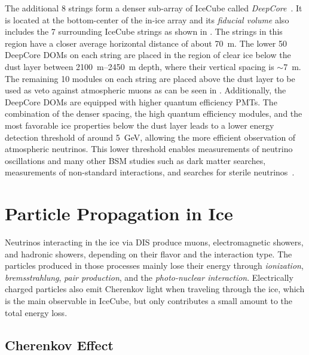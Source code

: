 The additional 8 strings form a denser sub-array of IceCube called \textit{DeepCore}~. It is located at the bottom-center of the in-ice array and its \textit{fiducial volume} also includes the 7 surrounding IceCube strings as shown in . The strings in this region have a closer average horizontal distance of about \SI{70}{\meter}. The lower 50 DeepCore DOMs on each string are placed in the region of clear ice below the dust layer between \SIrange{2100}{2450}{\meter} depth, where their vertical spacing is $\sim$\SI{7}{\meter}. The remaining 10 modules on each string are placed above the dust layer to be used as veto against atmospheric muons as can be seen in . Additionally, the DeepCore DOMs are equipped with higher quantum efficiency PMTs. The combination of the denser spacing, the high quantum efficiency modules, and the most favorable ice properties below the dust layer leads to a lower energy detection threshold of around \SI{5}{GeV}, allowing the more efficient observation of atmospheric neutrinos. This lower threshold enables measurements of neutrino oscillations and many other BSM studies such as dark matter searches, measurements of non-standard interactions, and searches for sterile neutrinos~.


\section{Particle Propagation in Ice} 

Neutrinos interacting in the ice via DIS produce muons, electromagnetic showers, and hadronic showers, depending on their flavor and the interaction type. The particles produced in those processes mainly lose their energy through \textit{ionization}, \textit{bremsstrahlung}, \textit{pair production}, and the \textit{photo-nuclear interaction}. Electrically charged particles also emit Cherenkov light when traveling through the ice, which is the main observable in IceCube, but only contributes a small amount to the total energy loss.


\subsection{Cherenkov Effect} 

